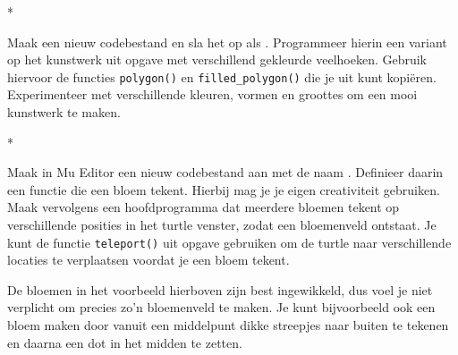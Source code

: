 \documentclass[../main]{subfiles}
\begin{document}
\begin{antwoord}
*
\end{antwoord}
\begin{opgave}[icons={laptop}]
%
Maak een nieuw codebestand en sla het op als . Programmeer hierin een variant op het kunstwerk uit opgave \pgfmathresult{} met verschillend gekleurde veelhoeken. Gebruik hiervoor de functies \texttt{polygon()} en \texttt{filled\_polygon()} die je uit  kunt kopiëren. Experimenteer met verschillende kleuren, vormen en groottes om een mooi kunstwerk te maken.
\begin{center}
\end{center}
\end{opgave}
\begin{antwoord}
*
\end{antwoord}
\begin{opgave}[icons={laptop}]
Maak in Mu Editor een nieuw codebestand aan met de naam .
Definieer daarin een functie die een bloem tekent. Hierbij mag je je eigen creativiteit gebruiken. Maak vervolgens een hoofdprogramma dat meerdere bloemen tekent op verschillende posities in het turtle venster, zodat een bloemenveld ontstaat. Je kunt de functie \texttt{teleport()} uit opgave \pgfmathresult{} gebruiken om de turtle naar verschillende locaties te verplaatsen voordat je een bloem tekent.

\begin{center}
\end{center}

De bloemen in het voorbeeld hierboven zijn best ingewikkeld, dus voel je niet verplicht om precies zo'n bloemenveld te maken. Je kunt bijvoorbeeld ook een bloem maken door vanuit een middelpunt dikke streepjes naar buiten te tekenen en daarna een dot in het midden te zetten.
\end{opgave}
\end{document}
